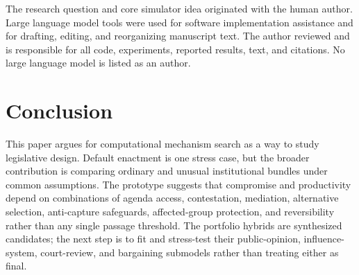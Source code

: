 \documentclass[manuscript,review,anonymous]{acmart}
\begin{document}
The research question and core simulator idea originated with the human author. Large language model tools were used for software implementation assistance and for drafting, editing, and reorganizing manuscript text. The author reviewed and is responsible for all code, experiments, reported results, text, and citations. No large language model is listed as an author.

\section{Conclusion}

This paper argues for computational mechanism search as a way to study legislative design. Default enactment is one stress case, but the broader contribution is comparing ordinary and unusual institutional bundles under common assumptions. The prototype suggests that compromise and productivity depend on combinations of agenda access, contestation, mediation, alternative selection, anti-capture safeguards, affected-group protection, and reversibility rather than any single passage threshold. The portfolio hybrids are synthesized candidates; the next step is to fit and stress-test their public-opinion, influence-system, court-review, and bargaining submodels rather than treating either as final.



\end{document}
